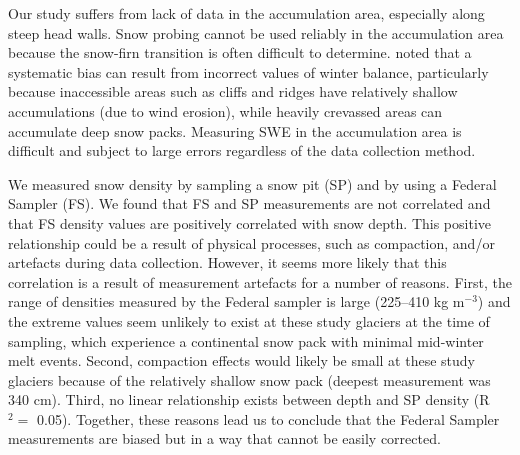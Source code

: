 \documentclass[twocolumn, letterpaper]{igs}
\begin{document}
Our study suffers from lack of data in the accumulation area, especially along steep head walls. Snow probing cannot be used reliably in the accumulation area because the snow-firn transition is often difficult to determine. \cite{Sold2013} noted that a systematic bias can result from incorrect values of winter balance, particularly because inaccessible areas such as cliffs and ridges have relatively shallow accumulations (due to wind erosion), while heavily crevassed areas can accumulate deep snow packs. Measuring SWE in the accumulation area is difficult and subject to large errors regardless of the data collection method.

We measured snow density by sampling a snow pit (SP) and by using a Federal Sampler (FS). We found that FS and SP measurements are not correlated and that FS density values are positively correlated with snow depth. This positive relationship could be a result of physical processes, such as compaction, and/or artefacts during data collection. However, it seems more likely that this correlation is a result of measurement artefacts for a number of reasons. First, the range of densities measured by the Federal sampler is large (225--410 kg m$^{-3}$) and the extreme values seem unlikely to exist at these study glaciers at the time of sampling, which experience a continental snow pack with minimal mid-winter melt events. Second, compaction effects would likely be small at these study glaciers because of the relatively shallow snow pack (deepest measurement was 340 cm). Third, no linear relationship exists between depth and SP density (R$^2=$ 0.05). Together, these reasons lead us to conclude that the Federal Sampler measurements are biased but in a way that cannot be easily corrected. 
\end{document}
